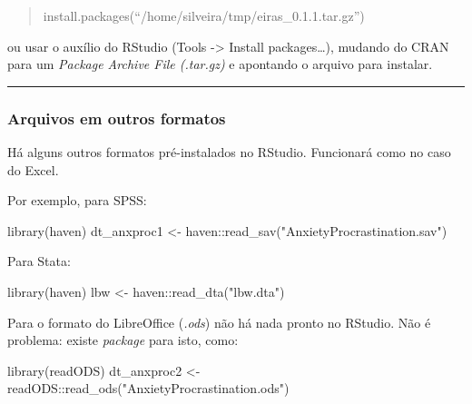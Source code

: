 \documentclass[
]{article}
\newenvironment{Shaded}{\begin{snugshade}}{\end{snugshade}}
\newcommand{\FunctionTok}[1]{\textcolor[rgb]{0.00,0.00,0.00}{#1}}
\newcommand{\NormalTok}[1]{#1}
\newcommand{\OtherTok}[1]{\textcolor[rgb]{0.56,0.35,0.01}{#1}}
\newcommand{\SpecialCharTok}[1]{\textcolor[rgb]{0.00,0.00,0.00}{#1}}
\newcommand{\StringTok}[1]{\textcolor[rgb]{0.31,0.60,0.02}{#1}}
\begin{document}
\begin{quote}
install.packages(``/home/silveira/tmp/eiras\_0.1.1.tar.gz'')
\end{quote}

ou usar o auxílio do RStudio (Tools -\textgreater{} Install
packages\ldots), mudando do CRAN para um \emph{Package Archive File
(.tar.gz)} e apontando o arquivo para instalar.

\begin{center}\rule{0.5\linewidth}{0.5pt}\end{center}

\hypertarget{arquivos-em-outros-formatos}{%
\subsubsection{Arquivos em outros
formatos}\label{arquivos-em-outros-formatos}}

Há alguns outros formatos pré-instalados no RStudio. Funcionará como no
caso do Excel.

Por exemplo, para SPSS:

\begin{Shaded}
\begin{Highlighting}[]
\FunctionTok{library}\NormalTok{(haven)}
\NormalTok{dt\_anxproc1 }\OtherTok{\textless{}{-}}\NormalTok{ haven}\SpecialCharTok{::}\FunctionTok{read\_sav}\NormalTok{(}\StringTok{"AnxietyProcrastination.sav"}\NormalTok{)}
\end{Highlighting}
\end{Shaded}

Para Stata:

\begin{Shaded}
\begin{Highlighting}[]
\FunctionTok{library}\NormalTok{(haven)}
\NormalTok{lbw }\OtherTok{\textless{}{-}}\NormalTok{ haven}\SpecialCharTok{::}\FunctionTok{read\_dta}\NormalTok{(}\StringTok{"lbw.dta"}\NormalTok{)}
\end{Highlighting}
\end{Shaded}

Para o formato do LibreOffice (\emph{.ods}) não há nada pronto no
RStudio. Não é problema: existe \emph{package} para isto, como:

\begin{Shaded}
\begin{Highlighting}[]
\FunctionTok{library}\NormalTok{(readODS)}
\NormalTok{dt\_anxproc2 }\OtherTok{\textless{}{-}}\NormalTok{ readODS}\SpecialCharTok{::}\FunctionTok{read\_ods}\NormalTok{(}\StringTok{"AnxietyProcrastination.ods"}\NormalTok{)}
\end{Highlighting}
\end{Shaded}
\end{document}
